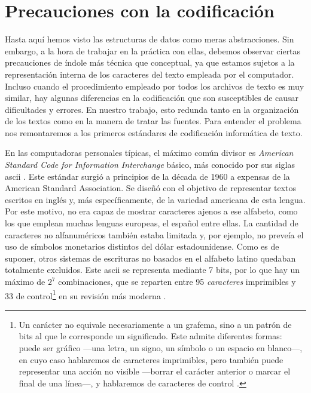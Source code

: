 \section{Precauciones con la codificación}
Hasta aquí hemos visto las estructuras de datos como meras abstracciones. Sin embargo, a la hora de trabajar en la práctica con ellas, debemos observar ciertas precauciones de índole más técnica que conceptual, ya que estamos sujetos a la representación interna de los caracteres del texto empleada por el computador. Incluso cuando el procedimiento empleado por todos los archivos de texto es muy similar, hay algunas diferencias en la codificación que son susceptibles de causar dificultades y errores. En nuestro trabajo, esto redunda tanto en la organización de los textos como en la manera de tratar las fuentes. Para entender el problema nos remontaremos a los primeros estándares de codificación informática de texto.

En las computadoras personales típicas, el máximo común divisor es  \textit{American Standard Code for Information Interchange} básico, más conocido por sus siglas \ac{ascii} \parencite{wells1997}. Este estándar surgió a principios de la década de 1960 a expensas de la American Standard Association. Se diseñó con el objetivo de representar textos escritos en inglés y, más específicamente, de la variedad americana de esta lengua. Por este motivo, no era capaz de mostrar caracteres ajenos a ese alfabeto, como los que emplean muchas lenguas europeas, el español entre ellas. La cantidad de caracteres no alfanuméricos también estaba limitada y, por ejemplo, no preveía el uso de símbolos monetarios distintos del dólar estadounidense. Como es de suponer, otros sistemas de escrituras no basados en el alfabeto latino quedaban totalmente excluidos. Este \ac{ascii} se representa mediante 7 bits, por lo que hay un máximo de $2^7$ combinaciones, que se reparten entre 95 \textit{caracteres} imprimibles y 33 de control\footnote{Un carácter no equivale necesariamente a un grafema, sino a un patrón de bits al que le corresponde un significado. Este admite diferentes formas: puede ser gráfico —una letra, un signo, un símbolo o un espacio en blanco—, en cuyo caso hablaremos de caracteres imprimibles, pero también puede representar una acción no visible —borrar el carácter anterior o marcar el final de una línea—, y hablaremos de caracteres de control \parencite[139]{haralambous2019}.} en su revisión más moderna \parencite[423-433]{mackenzie1980}. 

